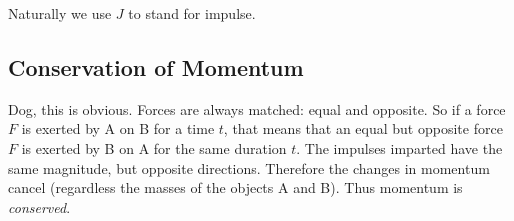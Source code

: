 Naturally we use $J$ to stand for impulse.

\subsection{Conservation of Momentum}

Dog, this is obvious. Forces are always matched: equal and opposite. So
if a force $F$ is exerted by A on B for a time $t$, that means that an
equal but opposite force $F$ is exerted by B on A for the same duration
$t$. The impulses imparted have the same magnitude, but opposite
directions. Therefore the changes in momentum cancel (regardless the
masses of the objects A and B). Thus momentum is \emph{conserved}.
